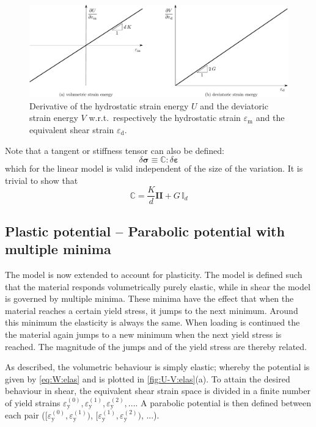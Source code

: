 \documentclass[fleqn, colorlinks]{goose-article}
\begin{document}
\begin{figure}[htp]
    \centering
    \includegraphics[width=1.\textwidth]{figures/potential_dU-dV_elas}
    \caption{
        Derivative of the hydrostatic strain energy $U$ and the deviatoric strain energy $V$
        w.r.t.\ respectively the hydrostatic strain $\varepsilon_\mathrm{m}$ and
        the equivalent shear strain $\varepsilon_\mathrm{d}$.}
    \label{fig:dU-dV:elas}
\end{figure}

Note that a tangent or stiffness tensor can also be defined:
\begin{equation}
    \delta \bm{\sigma} \equiv \mathbb{C} : \delta \bm{\varepsilon}
\end{equation}
which for the linear model is valid independent of the size of the variation.
It is trivial to show that
\begin{equation}
    \mathbb{C} = \frac{K}{d} \bm{I} \bm{I} + G \, \mathbb{I}_d
\end{equation}

\subsection{Plastic potential -- Parabolic potential with multiple minima}

The model is now extended to account for plasticity.
The model is defined such that the material responds volumetrically purely elastic,
while in shear the model is governed by multiple minima.
These minima have the effect that when the material reaches a certain yield stress,
it jumps to the next minimum.
Around this minimum the elasticity is always the same.
When loading is continued the the material again jumps to a new minimum
when the next yield stress is reached.
The magnitude of the jumps and of the yield stress are thereby related.

As described, the volumetric behaviour is simply elastic; whereby the potential is given by
\cref{eq:W:elas} and is plotted in \cref{fig:U-V:elas}(a).
To attain the desired behaviour in shear, the equivalent shear strain space is divided in a
finite number of yield strains $\varepsilon_\mathrm{y}^{(0)},
\varepsilon_\mathrm{y}^{(1)}, \varepsilon_\mathrm{y}^{(2)}, ...$.
A parabolic potential is then defined between each pair
($[ \varepsilon_\mathrm{y}^{(0)}, \varepsilon_\mathrm{y}^{(1)} )$,
 $[ \varepsilon_\mathrm{y}^{(1)}, \varepsilon_\mathrm{y}^{(2)} )$, ...).
\end{document}
